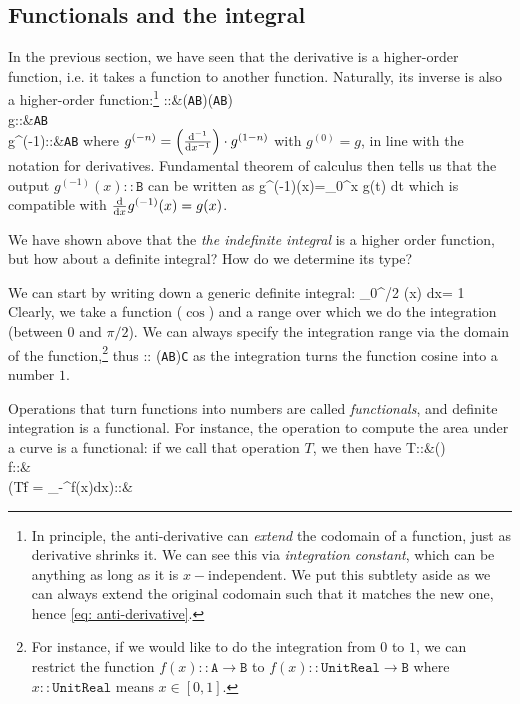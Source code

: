 \subsection{Functionals and the integral}
In the previous section, we have seen that the derivative is a higher-order function, i.e. it takes a function to another function. Naturally, its inverse is also a higher-order function:\footnote{In principle, the anti-derivative can \emph{extend} the codomain of a function, just as derivative shrinks it. We can see this via \emph{integration constant}, which can be anything as long as it is $x-$independent. We put this subtlety aside as we can always extend the original codomain such that it matches the new one, hence \eqref{eq: anti-derivative}.}
\bea 
{}::{}&\left(\texttt{A}\to\texttt{B}\right)\to\left(\texttt{A}\to\texttt{B}\right)\label{eq: anti-derivative}\\
g::{}&\texttt{A}\to\texttt{B}\\
g^{(-1)}::{}&\texttt{A}\to\texttt{B}
\eea  
where $g^{(-n)}=\left(\frac{\dd {}^{-1}}{\dd x^{-1}}\right)\cdot g^{(1-n)}$ with $g^{(0)}=g$, in line with the notation for derivatives. Fundamental theorem of calculus then tells us that the output \mbox{$g^{(-1)}(x)::\texttt{B}$} can be written as
\be 
g^{(-1)}(x)=\int\limits_0^x g(t) dt
\ee 
which is compatible with $\frac{\dd }{\dd x}g^{(-1)}(x)=g(x)$.

We have shown above that the \emph{the indefinite integral} is a higher order function, but how about a definite integral? How do we determine its type?

We can start by writing down a generic definite integral:
\be 
\int\limits_{0}^{\pi/2} \cos(x) dx= 1
\ee 
Clearly, we take a function ($\cos$) and a range over which we do the integration (between $0$ and $\pi/2$). We can always specify the integration range via the domain of the function,\footnote{
	For instance, if we would like to do the integration from $0$ to $1$, we can restrict the function $f(x)::\texttt{A}\to\texttt{B}$ to $f(x)::\texttt{UnitReal}\to\texttt{B}$ where $x::\texttt{UnitReal}$ means $x\in[0,1]$.
} thus
\be 
\int\limits :: (\texttt{A}\to\texttt{B})\to\texttt{C}
\ee 
as the integration turns the function cosine into a number $1$.

Operations that turn functions into numbers are called \emph{functionals}, and definite integration is a functional.  For instance, the operation to compute the area under a curve is a functional: if we call that operation $T$, we then have
\bea 
T::{}&\left(\R\to\R\right)\to\R\\
f::{}&\R\to\R\\
\left(T\.f = \int\limits_{-\infty}^\infty f(x)dx\right)::{}&\R
\eea  

